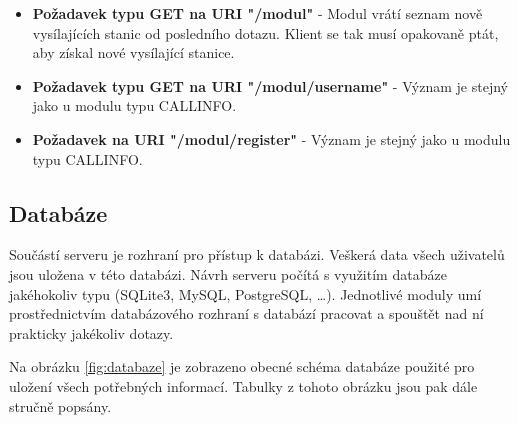 \begin{itemize}
\item \textbf{Požadavek typu GET na URI "/modul"} - Modul vrátí seznam nově vysílajících stanic od posledního dotazu. Klient se tak
musí opakovaně ptát, aby získal nové vysílající stanice.
\item \textbf{Požadavek typu GET na URI "/modul/username"} - Význam je stejný jako u modulu typu CALLINFO.
\item \textbf{Požadavek na URI "/modul/register"} - Význam je stejný jako u modulu typu CALLINFO.
\end{itemize}

\subsection{Databáze}
\label{navrh_databaze}

Součástí serveru je rozhraní pro přístup k databázi. Veškerá data všech
uživatelů jsou uložena v této databázi.
Návrh serveru počítá s využitím databáze jakéhokoliv typu (SQLite3, MySQL, PostgreSQL, \dots). Jednotlivé moduly
umí prostřednictvím databázového rozhraní s databází pracovat a spouštět nad ní prakticky jakékoliv dotazy.

Na obrázku \ref{fig:databaze} je zobrazeno obecné schéma databáze použité pro uložení všech potřebných informací. Tabulky
z tohoto obrázku jsou pak dále stručně popsány.

